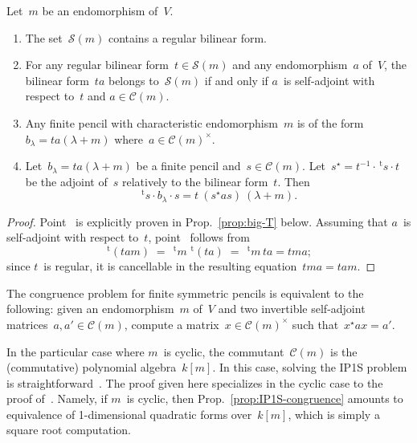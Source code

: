 \documentclass{lms}%
\let\ro\mathscr
\def\transpose{\,{}^{\mathrm{t}\!}}
\begin{document}
\begin{prop}\label{prop:structure-sym}
Let~$m$ be an endomorphism of~$V$.
\begin{enumerate}
\item \label{it:sym-inv} The set~$\ro S(m)$ contains a regular bilinear
form.
\item \label{it:sym-comm} For any regular bilinear form~$t ∈ \ro S(m)$
and any endomorphism~$a$ of~$V$, the bilinear form~$ta$ belongs to~$\ro
S(m)$ if and only if $a$~is self-adjoint with respect to~$t$ and $a ∈ \ro
C(m)$.
\item Any finite pencil with characteristic endomorphism~$m$ is of the
form $b_{λ} = ta (λ+m)$ where~$a ∈ \ro C(m)^{×}$.
\item Let~$b_{λ} = ta(λ+m)$ be a finite pencil and~$s ∈ \ro C(m)$.
Let~$s^{⋆} = t^{-1} · \transpose{s} · t$ be the adjoint of~$s$
relatively to the bilinear form~$t$. Then
\begin{equation}
\transpose{s} · b_{λ} · s = t\: (s^{⋆} a s)\: (λ + m).
\end{equation}
\end{enumerate}
\end{prop}

\begin{proof}
Point~ is explicitly proven in Prop.~\ref{prop:big-T}
below. Assuming that $a$~is self-adjoint with respect to~$t$,
point~ follows from
\begin{equation}
\transpose{(tam)} \;=\; \transpose{m}\, \transpose{(ta)}
 \;=\; \transpose{m}\,ta = tma;
\end{equation}
since $t$~is regular, it is cancellable in the resulting equation~$tma
= tam$.
\end{proof}

\begin{prop}\label{prop:IP1S-congruence}
The congruence problem for finite symmetric pencils is equivalent to the
following: given an endomorphism~$m$ of~$V$ and two invertible
self-adjoint matrices~$a, a' ∈ \ro C(m)$, compute a matrix~$x ∈ \ro
C(m)^{×}$ such that~$x^{⋆} a x = a'$.
\end{prop}

In the particular case where $m$~is cyclic, the commutant~$\ro C(m)$ is
the (commutative) polynomial algebra~$k[m]$. In this case, solving the
IP1S problem is straightforward~\cite{MPG2013}. The proof given here
specializes in the cyclic case to the proof of~\cite{MPG2013}. Namely, if
$m$~is cyclic, then Prop.~\ref{prop:IP1S-congruence} amounts to
equivalence of 1-dimensional quadratic forms over~$k[m]$, which is simply
a square root computation.
\end{document}
